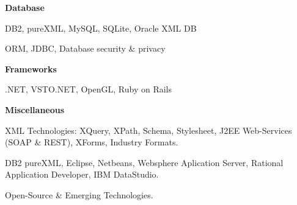 \documentclass[10pt]{article}
\newenvironment{innerlist}[1][\enskip\textbullet]%
        {\begin{compactenum}[#1]}{\end{compactenum}}
\newcommand{\blankline}{\quad\pagebreak[2]}
\begin{document}
\blankline

\textbf{Database}
\begin{innerlist}
	\item DB2, pureXML, MySQL, SQLite, Oracle XML DB
	\item ORM, JDBC, Database security \& privacy
\end{innerlist}

\blankline

\textbf{Frameworks}
\begin{innerlist}
	\item .NET, VSTO.NET, OpenGL, Ruby on Rails
\end{innerlist}

\blankline

\textbf{Miscellaneous}
\begin{innerlist}
	\item XML Technologies: XQuery, XPath, Schema, Stylesheet, J2EE Web-Services (SOAP \& REST), XForms, Industry Formats.
	\item DB2 pureXML, Eclipse, Netbeans, Websphere Aplication Server, Rational Application Developer, IBM DataStudio.
	\item Open-Source \& Emerging Technologies.
\end{innerlist}
\end{document}
